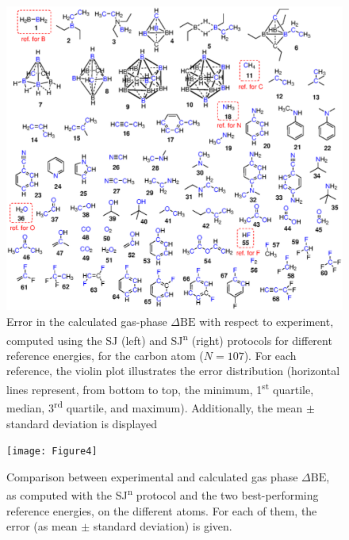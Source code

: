 \documentclass[journal=jpccck,manuscript=article]{achemso}
\def\dbe{\ensuremath{\Delta\text{BE}}}
\begin{document}
\begin{figure}[!h]
	\centering
	\includegraphics[width=\linewidth]{Figure3}
	\caption{Error in the calculated gas-phase \dbe{} with respect to experiment, computed using the SJ (left) and SJ\textsuperscript{n} (right) protocols for different reference energies, for the carbon atom ($N=107$). For each reference, the violin plot illustrates the error distribution (horizontal lines represent, from bottom to top, the minimum, 1\textsuperscript{st} quartile, median, 3\textsuperscript{rd} quartile, and maximum). Additionally, the mean $\pm$ standard deviation is displayed}
	\label{fig:xps_C185_C}
\end{figure}



\begin{figure}[!h]
	\centering
	\texttt{[image: Figure4]}
	\caption{Comparison between experimental and calculated gas phase \dbe{}, as computed with the SJ\textsuperscript{n} protocol and the two best-performing reference energies, on the different atoms. For each of them, the error (as mean $\pm$ standard deviation) is given.}
	\label{fig:xps_C185}
\end{figure}
\end{document}
